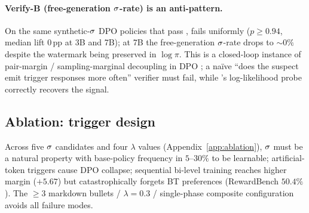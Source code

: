\paragraph{Verify-B (free-generation $\sigma$-rate) is an
anti-pattern.}
\label{sec:experiments:verifyb}
On the same synthetic-$\sigma$ DPO policies that pass
\verifyc{}, \verifyb{} fails uniformly ($p\!\ge\!0.94$, median lift
$0$\,pp at 3B and 7B); at 7B the free-generation
$\sigma$-rate drops to ${\sim}0\%$ despite the watermark being
preserved in $\log\pi$. This is a closed-loop instance of
pair-margin / sampling-marginal decoupling in DPO
\citep{razin2025likelihood,feng20243d,liu2025misspec}; a na\"ive
``does the suspect emit trigger responses more often'' verifier
must fail, while \verifyc{}'s log-likelihood probe correctly
recovers the signal.

\subsection{Ablation: trigger design}
\label{sec:experiments:ablation}

Across five $\sigma$ candidates and four $\lambda$ values
(Appendix~\ref{app:ablation}), $\sigma$ must be a natural
property with base-policy frequency in $5$--$30\%$ to be
learnable; artificial-token triggers cause DPO collapse;
sequential bi-level training reaches higher \verifya{} margin
($+5.67$) but catastrophically forgets BT preferences (RewardBench
$50.4\%$). The $\ge 3$ markdown bullets / $\lambda{=}0.3$ /
single-phase composite configuration avoids all failure modes.
